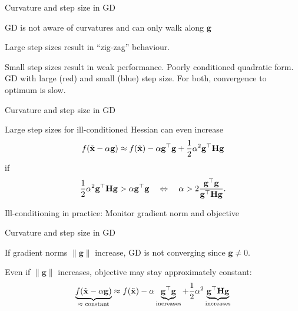 \documentclass[11pt,compress,t,notes=noshow, xcolor=table]{beamer}
\begin{document}
\begin{framei}{Curvature and step size in GD}
\item GD is not aware of curvatures and can only walk along $\mathbf{g}$
\item Large step sizes result in ``zig-zag'' behaviour.
\item Small step sizes result in weak performance.
\centering\footnotesize Poorly conditioned quadratic form. GD with large (red) and small (blue) step size. For both, convergence to optimum is slow.
\end{framei}


\begin{framei}{Curvature and step size in GD}
\item Large step sizes for ill-conditioned Hessian can even increase
$$f(\tilde{\mathbf{x}} - \alpha \mathbf{g}) \approx f(\tilde{\mathbf{x}}) - \alpha \mathbf{g}^\top \mathbf{g} + \frac{1}{2} \alpha^2 \mathbf{g}^\top \mathbf{H} \mathbf{g}$$
if $$\frac{1}{2} \alpha^2 \mathbf{g}^\top \mathbf{H} \mathbf{g} > \alpha \mathbf{g}^\top\mathbf{g} \quad \Leftrightarrow \quad \alpha > 2\frac{\mathbf{g}^\top \mathbf{g}}{\mathbf{g}^\top \mathbf{H} \mathbf{g}}.$$
\item Ill-conditioning in practice: Monitor gradient norm and objective
\end{framei}


\begin{framei}{Curvature and step size in GD}
\item If gradient norms $\|\mathbf{g}\|$ increase, GD is not converging since $\mathbf{g} \not= 0$.
\item Even if $\|\mathbf{g}\|$ increases, objective may stay approximately constant:
$$\underbrace{f(\tilde{\mathbf{x}}-\alpha \mathbf{g})}_{\text{$\approx$ constant}} \approx f(\tilde{\mathbf{x}}) - \alpha \underbrace{\mathbf{g}^\top \mathbf{g}}_{\text{increases}} + \frac{1}{2} \alpha^2 \underbrace{\mathbf{g}^\top \mathbf{H} \mathbf{g}}_{\text{increases}}$$
\end{framei}

\endlecture
\end{document}
